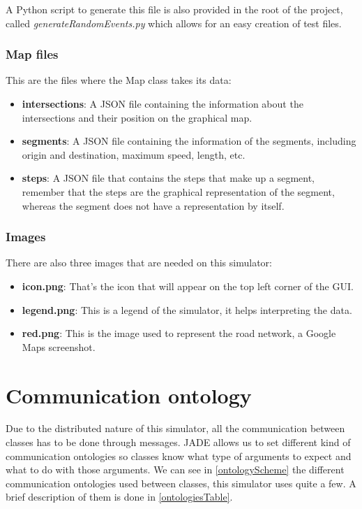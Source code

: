 A Python script to generate this file is also provided in the root of the project, called \emph{generateRandomEvents.py} which allows for an easy creation of test files.

\subsubsection{Map files}

This are the files where the Map class takes its data:

\begin{itemize}
\item \textbf{intersections}: A JSON file containing the information about the intersections and their position on the graphical map.
\item \textbf{segments}: A JSON file containing the information of the segments, including origin and destination, maximum speed, length, etc.
\item \textbf{steps}: A JSON file that contains the steps that make up a segment, remember that the steps are the graphical representation of the segment, whereas the segment does not have a representation by itself.
\end{itemize}

\subsubsection{Images}

There are also three images that are needed on this simulator:

\begin{itemize}
\item \textbf{icon.png}: That's the icon that will appear on the top left corner of the GUI.
\item \textbf{legend.png}: This is a legend of the simulator, it helps interpreting the data.
\item \textbf{red.png}: This is the image used to represent the road network, a Google Maps screenshot.
\end{itemize}

\section{Communication ontology}

Due to the distributed nature of this simulator, all the communication between classes has to be done through messages. JADE allows us to set different kind of communication ontologies so classes know what type of arguments to expect and what to do with those arguments. We can see in \ref{ontologyScheme} the different communication ontologies used between classes, this simulator uses quite a few. A brief description of them is done in \ref{ontologiesTable}.

